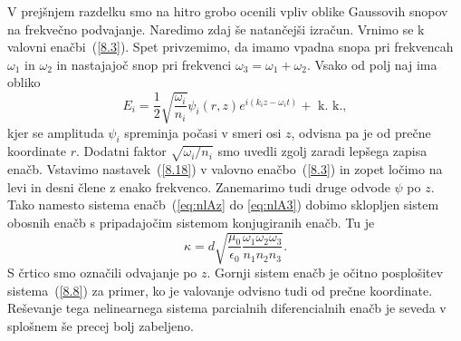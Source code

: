 \documentclass[11pt,fleqn]{book} %
\begin{document}
V prejšnjem razdelku smo na hitro grobo ocenili vpliv oblike Gaussovih snopov
na frekvečno podvajanje. Naredimo zdaj še natančejši izračun. Vrnimo se k valovni
enačbi~(\ref{8.3}). Spet privzemimo, da imamo vpadna snopa pri frekvencah
$\omega_{1}$ in $\omega_{2}$ in nastajajoč snop pri frekvenci
$\omega_{3}=\omega_{1}+\omega_{2}$.
Vsako od polj naj ima obliko 
\begin{equation}
E_{i}=\frac{1}{2}\sqrt{\frac{\omega_{i}}{n_{i}}}\psi_{i}(r,z)
e^{i(k_{i}z-\omega_{i}t)}+\mbox{ k. k.},
\label{8.18}
\end{equation}
kjer se amplituda $\psi_{i}$ spreminja počasi v smeri osi $z$,
odvisna pa je od prečne koordinate $r$. Dodatni faktor $\sqrt{\omega_{i}/n_{i}}$
smo uvedli zgolj zaradi lepšega zapisa enačb. Vstavimo nastavek~(\ref{8.18}) v valovno
enačbo~(\ref{8.3}) in zopet ločimo na levi in desni člene z enako frekvenco.
Zanemarimo tudi druge odvode $\psi$ po $z$. Tako namesto sistema
enačb~(\ref{eq:nlAz} do \ref{eq:nlA3}) dobimo sklopljen sistem obosnih enačb 
s pripadajočim sistemom konjugiranih enačb. Tu je 
\begin{equation}
\kappa=d\sqrt{\frac{\mu_{0}}{\epsilon_{0}}\frac{\omega_{1}\omega_{2}\omega_{3}}{n_{1}n_{2}n_{3}}}.
\label{8.20}
\end{equation}
S črtico smo označili odvajanje po $z$. Gornji sistem enačb je očitno
posplošitev sistema~(\ref{8.8}) za primer, ko je valovanje odvisno
tudi od prečne koordinate. Reševanje tega nelinearnega sistema parcialnih
diferencialnih enačb je seveda v splošnem še precej bolj zabeljeno.
\end{document}
